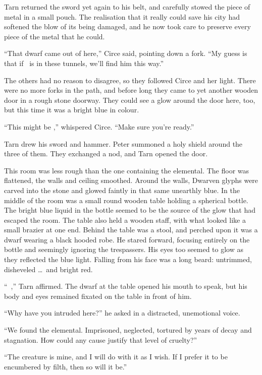 Tarn returned the sword yet again to his belt, and carefully stowed the piece of metal in a small pouch.  The realisation that it really could save his city had softened the blow of its being damaged, and he now took care to preserve every piece of the metal that he could.

``That dwarf came out of here,'' Circe said, pointing down a fork.  ``My guess is that if \mothzam\ is in these tunnels, we'll find him this way.''

The others had no reason to disagree, so they followed Circe and her light.  There were no more forks in the path, and before long they came to yet another wooden door in a rough stone doorway.  They could see a glow around the door here, too, but this time it was a bright blue in colour.

``This might be \mothzam,'' whispered Circe.  ``Make sure you're ready.''

Tarn drew his sword and hammer.  Peter summoned a holy shield around the three of them.  They exchanged a nod, and Tarn opened the door.

This room was less rough than the one containing the elemental.  The floor was flattened, the walls and ceiling smoothed.  Around the walls, Dwarven glyphs were carved into the stone and glowed faintly in that same unearthly blue.  In the middle of the room was a small round wooden table holding a spherical bottle.  The bright blue liquid in the bottle seemed to be the source of the glow that had escaped the room.  The table also held a wooden staff, with what looked like a small brazier at one end.
Behind the table was a stool, and perched upon it was a dwarf wearing a black hooded robe.  He stared forward, focusing entirely on the bottle and seemingly ignoring the trespassers.  His eyes too seemed to glow as they reflected the blue light.  Falling from his face was a long beard: untrimmed, disheveled \ldots\ and bright red.

``\mothzam\ \driktur,'' Tarn affirmed.  The dwarf at the table opened his mouth to speak, but his body and eyes remained fixated on the table in front of him.

``Why have you intruded here?'' he asked in a distracted, unemotional voice.

``We found the elemental.  Imprisoned, neglected, tortured by years of decay and stagnation.  How could any cause justify that level of cruelty?''

``The creature is mine, and I will do with it as I wish.  If I prefer it to be encumbered by filth, then so will it be.''

